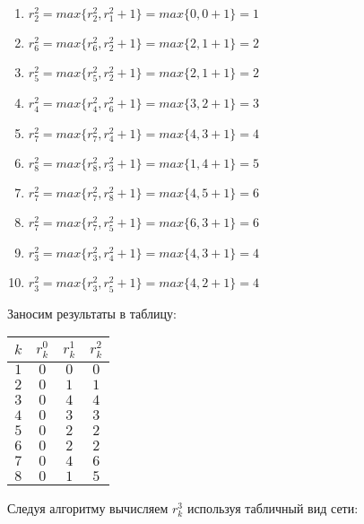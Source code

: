 \begin{enumerate}[nosep]
	\item $r_2^2 = max\{r_2^2, r_1^2 + 1\} = max\{0,0+1\} = 1$
	\item $r_6^2 = max\{r_6^2, r_2^2 + 1\} = max\{2,1+1\} = 2$
	\item $r_5^2 = max\{r_5^2, r_2^2 + 1\} = max\{2,1+1\} = 2$
	\item $r_4^2 = max\{r_4^2, r_6^2 + 1\} = max\{3,2+1\} = 3$
	\item $r_7^2 = max\{r_7^2, r_4^2 + 1\} = max\{4,3+1\} = 4$
	\item $r_8^2 = max\{r_8^2, r_3^2 + 1\} = max\{1,4+1\} = 5$
	\item $r_7^2 = max\{r_7^2, r_8^2 + 1\} = max\{4,5+1\} = 6$
	\item $r_7^2 = max\{r_7^2, r_5^2 + 1\} = max\{6,3+1\} = 6$
	\item $r_3^2 = max\{r_3^2, r_4^2 + 1\} = max\{4,3+1\} = 4$
	\item $r_3^2 = max\{r_3^2, r_5^2 + 1\} = max\{4,2+1\} = 4$
\end{enumerate}

Заносим результаты в таблицу:

\begin{table}[H]
	\centering
	\begin{tabular}{ | c | c | c | c |} 
		\hline
		$k$ & $r_k^0$ & $r_k^1$ & $r_k^2$ \\ \hline
		$1$ & $0$ & $0$ & $0$ \\ \hline
		$2$ & $0$ & $1$ & $1$ \\ \hline
		$3$ & $0$ & $4$ & $4$ \\ \hline
		$4$ & $0$ & $3$ & $3$ \\ \hline
		$5$ & $0$ & $2$ & $2$ \\ \hline
		$6$ & $0$ & $2$ & $2$ \\ \hline
		$7$ & $0$ & $4$ & $6$ \\ \hline
		$8$ & $0$ & $1$ & $5$ \\ \hline
	\end{tabular}
\end{table}


\bigskip

Следуя алгоритму вычисляем $r^3_k$ используя табличный вид сети:

